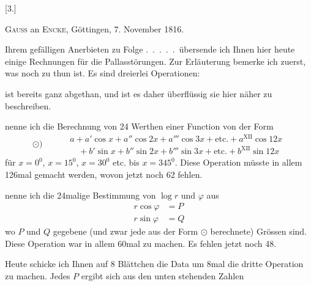 \begin{landscape}
\begingroup
\fontsize{10}{13}\selectfont
{}
\renewcommand{\headrulewidth}{0pt}
\par\medskip
{}
\begin{center}[3.]\par\medskip
\textsc{Gauss} an \textsc{Encke}, Göttingen, 7. November 1816.
\end{center}
\par\noindent\hspace*{\parindent}Ihrem gefälligen Anerbieten zu Folge .\ .\ .\ .\ .\ übersende ich Ihnen hier
heute einige Rechnungen für die Pallasstörungen. Zur Erläuterung bemerke
ich zuerst, was noch zu thun ist. Es sind dreierlei Operationen:
\par\noindent\hspace*{\parindent} ist bereits ganz abgethan, und ist es daher überflüssig
sie hier näher zu beschreiben.
\par\noindent\hspace*{\parindent} nenne ich die Berechnung von 24 Werthen einer
Function von der Form
\[
\odot)\qquad
\begin{aligned}
&a+a'\cos x+a''\cos2x+a'''\cos3x+\text{etc.}+a^{\mathrm{XII}}\cos12x\\
&\quad+b'\sin x+b''\sin2x+b'''\sin3x+\text{etc.}+b^{\mathrm{XII}}\sin12x
\end{aligned}
\]
\noindent für \(x=0^0\), \(x=15^0\), \(x=30^0\) etc. bis \(x=345^0\). Diese Operation müsste in
allem 126mal gemacht werden, wovon jetzt noch 62 fehlen.
\par\noindent\hspace*{\parindent} nenne ich die 24malige Bestimmung von \(\log r\) und \(\varphi\) aus
\[
\begin{aligned}
r\cos\varphi&=P\\
r\sin\varphi&=Q
\end{aligned}
\]
\noindent wo \(P\) und \(Q\) gegebene (und zwar jede aus der Form \(\odot\) berechnete) Grössen
sind. Diese Operation war in allem 60mal zu machen. Es fehlen jetzt noch 48.
\par\noindent\hspace*{\parindent}Heute schicke ich Ihnen auf 8 Blättchen die Data um 8mal die dritte
Operation zu machen. Jedes \(P\) ergibt sich aus den unten stehenden Zahlen

\end{landscape}
